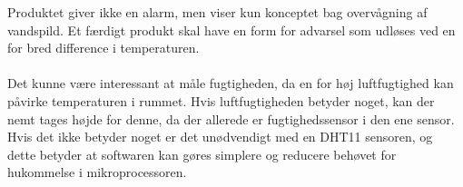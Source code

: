 Produktet giver ikke en alarm, men viser kun konceptet bag overvågning af vandspild. Et færdigt produkt skal have en form for advarsel som udløses ved en for bred difference i temperaturen.
\\
\\
Det kunne være interessant at måle fugtigheden, da en for høj luftfugtighed kan påvirke temperaturen i rummet. Hvis luftfugtigheden betyder noget, kan der nemt tages højde for denne, da der allerede er fugtighedssensor i den ene sensor. Hvis det ikke betyder noget er det unødvendigt med en DHT11 sensoren, og dette betyder at softwaren kan gøres simplere og reducere behøvet for hukommelse i mikroprocessoren.
\\
\\
%

